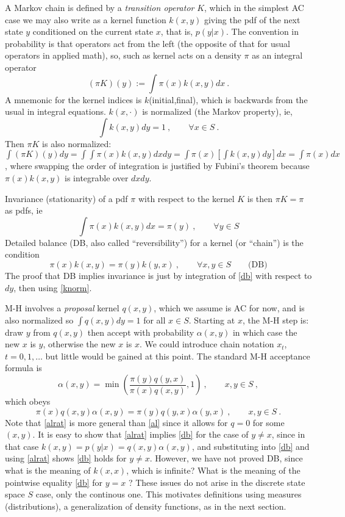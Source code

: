 \documentclass[10pt]{article}
\newcommand{\be}{\begin{equation}}
\newcommand{\ee}{\end{equation}}
\newcommand{\al}{\alpha}
\begin{document}
A Markov chain is defined by a {\em transition operator} $K$, which
in the simplest AC case we may also write as a kernel function
$k(x,y)$ giving the pdf
of the next state $y$ conditioned on
the current state $x$, that is, $p(y|x)$.
The convention in probability is that
operators act from the left
(the opposite of that for usual operators in applied math),
so, such as kernel acts on a density $\pi$ as an integral operator
\be
(\pi K)(y) := \int \pi(x) k(x,y) dx~.
\label{piK}
\ee
A mnemonic for the kernel indices is $k$(initial,final), which is backwards
from the usual in integral equations.
$k(x,\cdot)$ is normalized (the Markov property), ie,
\be
\int k(x,y) dy = 1~, \qquad \forall x\in S~.
\label{knorm}
\ee
Then $\pi K$ is also normalized:
$\int (\pi K)(y) dy = \int\int \pi(x) k(x,y) dx dy = \int \pi(x) [ \int k(x,y) dy] dx = \int \pi(x) dx$,
where swapping the order of integration
is justified by Fubini's theorem because $\pi(x)k(x,y)$ is integrable
over $dx dy$.

Invariance (stationarity) of a pdf $\pi$ with respect to the kernel $K$
is then $\pi K = \pi$ as pdfs, ie
\be
\int \pi(x) k(x,y) dx = \pi(y)~, \qquad \forall y\in S
\label{inv}
\ee
Detailed balance (DB, also called ``reversibility'') for a kernel
(or ``chain'')
is the condition
\be
\pi(x) k(x,y) = \pi(y) k(y,x)~, \qquad \forall x,y\in S
\qquad \mbox{(DB)}
\label{db}
\ee
The proof that DB implies invariance is just by integration
of \eqref{db} with respect to $dy$, then using \eqref{knorm}.

M-H involves a {\em proposal} kernel $q(x,y)$, which we assume is AC for now,
and is also normalized so $\int q(x,y) dy = 1$ for all $x\in S$.
Starting at $x$, the M-H step is: draw $y$ from $q(x,y)$ then
accept with probability $\al(x,y)$ in which case the new $x$ is $y$,
otherwise the new $x$ is $x$. We could introduce chain notation
$x_t$, $t=0,1,\dots$ but little would be gained at this point.
The standard M-H acceptance formula is
\be
\al(x,y) = \min\left(\frac{\pi(y) q(y,x)}{\pi(x) q(x,y)}, 1 \right)
~, \qquad x,y\in S~,
\label{al}
\ee
which obeys
\be
\pi(x) q(x,y) \al(x,y) = \pi(y) q(y,x) \al(y,x)
~, \qquad x,y\in S~.
\label{alrat}
\ee
Note that \eqref{alrat} is more general than \eqref{al} since it allows
for $q=0$ for some $(x,y)$.
It is easy to show that \eqref{alrat} implies \eqref{db} for the
case of $y\neq x$, since in that case $k(x,y) = p(y|x) = q(x,y)\al(x,y)$,
and substituting into \eqref{db} and using \eqref{alrat} shows
\eqref{db} holds for $y\neq x$.
However, we have not proved DB, since what is the meaning of $k(x,x)$,
which is infinite?
What is the meaning of the pointwise equality \eqref{db} for $y=x$ ?
These issues do not arise in the discrete state space $S$ case, only the continous one.
This motivates definitions using measures (distributions), a generalization of density functions, as in the next section.
\end{document}

